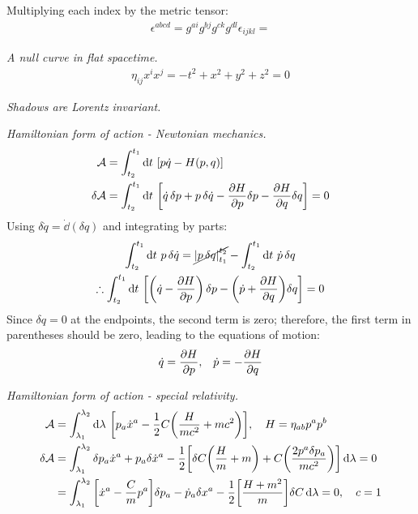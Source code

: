 \documentclass{report}
\begin{document}
\begin{subquests}
\begin{subquests}
		\item Multiplying each index by the metric tensor:
		\begin{gather*}
			\epsilon^{abcd} = g^{ai}g^{bj}g^{ck}g^{dl}\epsilon_{ijkl} = 
		\end{gather*}

		\item

		\item
	\end{subquests}
	\item \emph{A null curve in flat spacetime.}
	\begin{align*}
		\eta_{ij}x^{i}x^{j} = -t^2 + x^2 + y^2 + z^2 = 0 
	\end{align*}

	\item \emph{Shadows are Lorentz invariant.}

	\item \emph{Hamiltonian form of action - Newtonian mechanics.}
	\begin{align*}
		\mathcal A & = \int_{t_2}^{t_1}\dd{t}\,\bqty{p\dot q - H(p,q)} \\
		\delta\mathcal A & = \int_{t_2}^{t_1} \dd{t}\, \bqty{\dot q\,\delta p + p\,\delta\dot q  - \pdv{H}{p}\delta p - \pdv{H}{q}\delta q} = 0
	\end{align*}
	Using $\delta\dot q = \dot\dd(\delta q)$ and integrating by parts:
	\begin{gather*}
		\int_{t_2}^{t_1} \dd{t}\, p\,\delta \dot q = \cancel{\left|p\,\delta q\right|_{t_1}^{t_2}} - \int_{t_2}^{t_1} \dd{t}\,\dot p\, \delta q  \\
		\therefore \int_{t_2}^{t_1} \dd{t}\, \bqty{\pqty{\dot q -\pdv{H}{p}}\,\delta p - \pqty{\dot p + \pdv{H}{q}}\delta q} = 0
	\end{gather*}
	Since $\delta q = 0 $ at the endpoints, the second term is zero; therefore, the first term in parentheses should be zero, leading to the equations of motion:
	\begin{align*}
		\dot q = \pdv{H}{p},\;\;\;\dot p = -\pdv{H}{q} 	
	\end{align*} 
	
	\item \emph{Hamiltonian form of action - special relativity.}
	\begin{align*}
		\mathcal A & = \int_{\lambda_1}^{\lambda_2} \dd{\lambda}\, \bqty{p_a \dot x^a - \frac{1}{2}C\pqty{\frac{H}{mc^2} + mc^2}}, \quad H = \eta_{ab} p^a p^b \\
		\delta\mathcal A & = \int_{\lambda_1}^{\lambda_2}\delta p_a \dot x^a + p_a \delta\dot x^a -\frac{1}{2}\bqty{\delta C\pqty{\frac{H}{m} + m} + C\pqty{\frac{2p^a\delta p_a}{mc^2}}} \dd{\lambda} = 0 \\
		& = \int_{\lambda_1}^{\lambda_2} \bqty{\dot x^a - \frac{C}{m}p^a}\delta p_a - \dot p_a\delta x^a - \frac{1}{2}\bqty{\frac{H + m^2}{m}}\delta C \dd{\lambda} = 0, \quad c = 1
	\end{align*}


\end{subquests}
\end{document}
